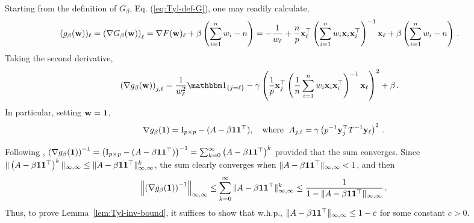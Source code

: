 \documentclass[times,sort&compress,3p]{elsarticle}
\begin{document}
Starting from the definition of $G_\beta$, Eq. (\ref{eq:Tyl-def-G}), one may readily calculate,
\begin{equation}\label{eq:Tyl-grad-G}
\begin{split}
    (g_\beta({\bf w}))_\ell=\left(\nabla G_\beta({\bf w})\right)_\ell 
    &= \nabla F({\bf w})_\ell + \beta\left(\sum_{i=1}^n w_i-n\right) 
    = -\frac{1}{w_\ell} + \frac{n}{p}{\bf x}_\ell^\top \left(\sum_{i=1}^n w_i {\bf x}_i{\bf x}_i^\top \right)^{-1}{\bf x}_\ell + \beta\left(\sum_{i=1}^n w_i-n\right) \,.
\end{split}
\end{equation}
Taking the second derivative,
\begin{equation}\label{eq:Tyl-hessian}
\begin{split}
    \left(\nabla g_\beta(\w)\right)_{j,\ell} 
    &= \frac{1}{w_\ell^2}\indic{j=\ell} - \gamma \left(\frac1p \x_j^\T \left( \frac1n \sum_{i=1}^n w_i\x_i\x_i^\T \right)^{-1} \x_\ell\right)^2 + \beta \,.
\end{split}
\end{equation}\label{eq:Tyl-hessian-at1}
In particular, setting ${\bf w}={\bf 1}$,
\begin{equation}\label{eq:Tyl-Zhang-1}
    \nabla g_\beta({\bf 1}) = \mathrm{I}_{p \times p} - ( A - \beta{\bf 1}{\bf 1}^\top),\quad \textrm{where }\; A_{j,\ell} = \gamma \left(p^{-1}{\bf y}_j^\top T^{-1}{\bf y}_\ell \right)^2\,.
\end{equation}

Following 
\cite[Lemma 3.3]{zhang2016marvcenko}, 
$\left(\nabla g_\beta({\bf 1})\right)^{-1}=\left( \mathrm{I}_{p \times p} - (A - \beta{\bf 1}{\bf 1}^\top)\right)^{-1} = \sum_{k=0}^\infty \left( A - \beta{\bf 1}{\bf 1}^\top\right)^k$ provided that the sum converges. Since $\|\left( A - \beta{\bf 1}{\bf 1}^\top\right)^k\|_{\infty,\infty} \le \| A - \beta{\bf 1}{\bf 1}^\top\|_{\infty,\infty}^k$, the sum clearly converges when $\| A - \beta{\bf 1}{\bf 1}^\top\|_{\infty,\infty}<1$, and then
\[
\left\| \left(\nabla g_\beta({\bf 1})\right)^{-1} \right\|_{\infty,\infty} \le \sum_{k=0}^\infty \| A - \beta{\bf 1}{\bf 1}^\top\|_{\infty,\infty}^k \le \frac{1}{1 - \| A - \beta{\bf 1}{\bf 1}^\top\|_{\infty,\infty}} \,.
\]
Thus, to prove Lemma~\ref{lem:Tyl-inv-bound}, it suffices to show that w.h.p., $\|A - \beta{\bf 1}{\bf 1}^\top\|_{\infty,\infty} \le 1-c$ for some constant $c>0$.
\end{document}
